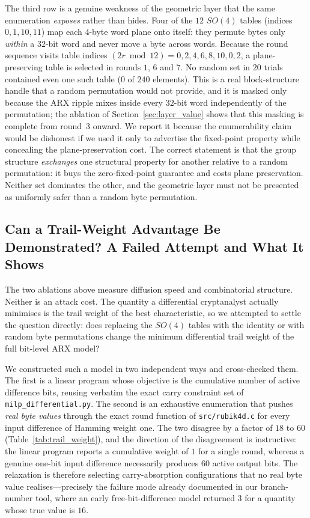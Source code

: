 \documentclass[review,12pt]{elsarticle}
\begin{document}
The third row is a genuine weakness of the geometric layer that the same enumeration \emph{exposes} rather than hides. Four of the $12$ $SO(4)$ tables (indices $0,1,10,11$) map each $4$-byte word plane onto itself: they permute bytes only \emph{within} a $32$-bit word and never move a byte across words. Because the round sequence visits table indices $(2r \bmod 12) = 0,2,4,6,8,10,0,2$, a plane-preserving table is selected in rounds $1$, $6$ and $7$. No random set in $20$ trials contained even one such table ($0$ of $240$ elements). This is a real block-structure handle that a random permutation would not provide, and it is masked only because the ARX ripple mixes inside every $32$-bit word independently of the permutation; the ablation of Section~\ref{sec:layer_value} shows that this masking is complete from round~$3$ onward. We report it because the enumerability claim would be dishonest if we used it only to advertise the fixed-point property while concealing the plane-preservation cost. The correct statement is that the group structure \emph{exchanges} one structural property for another relative to a random permutation: it buys the zero-fixed-point guarantee and costs plane preservation. Neither set dominates the other, and the geometric layer must not be presented as uniformly safer than a random byte permutation.



\subsection{Can a Trail-Weight Advantage Be Demonstrated? A Failed Attempt and What It Shows}
\label{sec:trail_weight}
The two ablations above measure diffusion speed and combinatorial structure. Neither is an attack cost. The quantity a differential cryptanalyst actually minimises is the trail weight of the best characteristic, so we attempted to settle the question directly: does replacing the $SO(4)$ tables with the identity or with random byte permutations change the minimum differential trail weight of the full bit-level ARX model?

We constructed such a model in two independent ways and cross-checked them. The first is a linear program whose objective is the cumulative number of active difference bits, reusing verbatim the exact carry constraint set of \texttt{milp\_differential.py}. The second is an exhaustive enumeration that pushes \emph{real byte values} through the exact round function of \texttt{src/rubik4d.c} for every input difference of Hamming weight one. The two disagree by a factor of $18$ to $60$ (Table~\ref{tab:trail_weight}), and the direction of the disagreement is instructive: the linear program reports a cumulative weight of $1$ for a single round, whereas a genuine one-bit input difference necessarily produces $60$ active output bits. The relaxation is therefore selecting carry-absorption configurations that no real byte value realises---precisely the failure mode already documented in our branch-number tool, where an early free-bit-difference model returned $3$ for a quantity whose true value is $16$.
\end{document}
